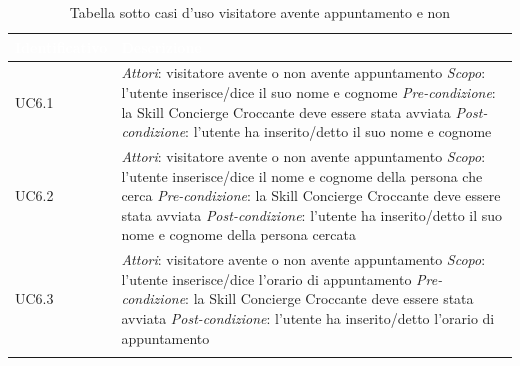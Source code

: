 \begin{center}
	\centering
	\renewcommand{\arraystretch}{1.5}
	\begin{longtable}{  p{2.5cm} p{9.6cm} }
		\rowcolor{tableHead}
		\textbf{\textcolor{white}{Identificativo}} & \textbf{\textcolor{white}{Descrizione}} \\
		\endhead  
		
		UC6.1 &  \textit{Attori}: visitatore avente o non avente appuntamento \newline \textit{Scopo}: l'utente inserisce/dice il suo nome e cognome \newline \textit{Pre-condizione}: la Skill Concierge Croccante deve essere stata avviata \newline \textit{Post-condizione}: l'utente ha inserito/detto il suo nome e cognome \\
		
		UC6.2 &  \textit{Attori}: visitatore avente o non avente appuntamento \newline \textit{Scopo}: l'utente inserisce/dice il nome e cognome della persona che cerca \newline \textit{Pre-condizione}: la Skill Concierge Croccante deve essere stata avviata \newline \textit{Post-condizione}: l'utente ha inserito/detto il suo nome e cognome della persona cercata \\
		
		UC6.3 &  \textit{Attori}: visitatore avente o non avente appuntamento \newline \textit{Scopo}: l'utente inserisce/dice l'orario di appuntamento \newline \textit{Pre-condizione}: la Skill Concierge Croccante deve essere stata avviata \newline \textit{Post-condizione}: l'utente ha inserito/detto l'orario di appuntamento \\
		
		\rowcolor{white}
		\caption{Tabella sotto casi d'uso visitatore avente appuntamento e non}
	\end{longtable}
\end{center}
